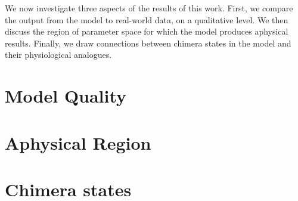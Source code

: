 We now investigate three aspects of the results of this work.
First, we compare the output from the model to real-world data, on a qualitative level.
We then discuss the region of parameter space for which the model produces aphysical results.
Finally, we draw connections between chimera states in the model and their physiological analogues.
\section{Model Quality}
\label{sec:results_model}


\section{Aphysical Region}
\label{sec:results_aphysical}


\section{Chimera states}
\label{sec:results_chimera}

